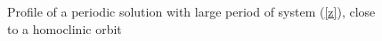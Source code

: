 \documentclass[10pt]{article}
\begin{document}
{\begin{figure}[ht]
\begin{center}
\caption{\small\label{demo3-3}Profile of a periodic solution with large period of
system (\ref{z}), close
to a homoclinic orbit}
\end{center}
\end{figure}

}
\end{document}
